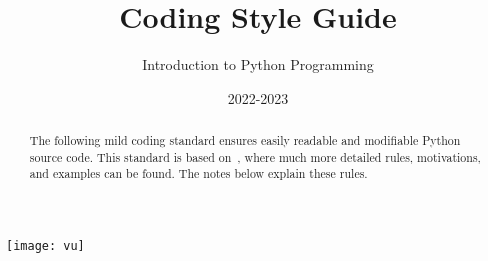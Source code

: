 \documentclass[nobib]{tufte-handout}
\title{Coding Style Guide}%
\author[Mauricio Verano Merino]{Introduction to Python Programming}
\date{2022-2023} %
\begin{document}
\maketitle%

\begin{marginfigure}[-4cm]%
  \texttt{[image: vu]}
\end{marginfigure}

\begin{abstract}
\noindent
The following mild coding standard ensures
easily readable and modifiable Python source code.
This standard is based on~\cite{CodeConventions:2001},
where much more detailed rules, motivations, and examples can be found.
The notes below explain these rules.\ci
\end{abstract}
\end{document}
